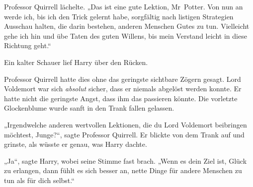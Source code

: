Professor Quirrell lächelte.
„Das ist eine gute Lektion, Mr~Potter. Von nun an werde ich, bis ich den Trick gelernt habe, sorgfältig nach listigen Strategien Ausschau halten, die darin bestehen, anderen Menschen Gutes zu tun. Vielleicht gehe ich hin und übe Taten des guten Willens, bis mein Verstand leicht in diese Richtung geht.“

Ein kalter Schauer lief Harry über den Rücken.

Professor Quirrell hatte dies ohne das geringste sichtbare Zögern gesagt.
Lord Voldemort war sich \emph{absolut} sicher, dass er niemals abgelöst werden konnte. Er hatte nicht die geringste Angst, dass ihm das passieren könnte.
Die vorletzte Glockenblume wurde sanft in den Trank fallen gelassen.

„Irgendwelche anderen wertvollen Lektionen, die du Lord Voldemort beibringen möchtest, Junge?“, sagte Professor Quirrell. Er blickte von dem Trank auf und grinste, als wüsste er genau, was Harry dachte.

„Ja“, sagte Harry, wobei seine Stimme fast brach.
„Wenn es dein Ziel ist, Glück zu erlangen, dann fühlt es sich besser an, nette Dinge für andere Menschen zu tun als für dich selbst.“

